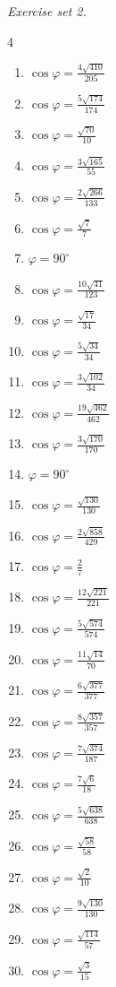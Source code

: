 \par\noindent\emph{Exercise set 2.}\nopagebreak
\begin{multicols}{4}\raggedright
\begin{enumerate}[label=\arabic*., leftmargin=*, itemsep=1pt]
\item $\cos\varphi=\frac{4 \sqrt{410}}{205}$
\item $\cos\varphi=\frac{5 \sqrt{174}}{174}$
\item $\cos\varphi=\frac{\sqrt{70}}{10}$
\item $\cos\varphi=\frac{3 \sqrt{165}}{55}$
\item $\cos\varphi=\frac{2 \sqrt{266}}{133}$
\item $\cos\varphi=\frac{\sqrt{7}}{7}$
\item $\varphi=90^\circ$
\item $\cos\varphi=\frac{10 \sqrt{41}}{123}$
\item $\cos\varphi=\frac{\sqrt{17}}{34}$
\item $\cos\varphi=\frac{5 \sqrt{34}}{34}$
\item $\cos\varphi=\frac{3 \sqrt{102}}{34}$
\item $\cos\varphi=\frac{19 \sqrt{462}}{462}$
\item $\cos\varphi=\frac{3 \sqrt{170}}{170}$
\item $\varphi=90^\circ$
\item $\cos\varphi=\frac{\sqrt{130}}{130}$
\item $\cos\varphi=\frac{2 \sqrt{858}}{429}$
\item $\cos\varphi=\frac{2}{7}$
\item $\cos\varphi=\frac{12 \sqrt{221}}{221}$
\item $\cos\varphi=\frac{5 \sqrt{574}}{574}$
\item $\cos\varphi=\frac{11 \sqrt{14}}{70}$
\item $\cos\varphi=\frac{6 \sqrt{377}}{377}$
\item $\cos\varphi=\frac{8 \sqrt{357}}{357}$
\item $\cos\varphi=\frac{7 \sqrt{374}}{187}$
\item $\cos\varphi=\frac{7 \sqrt{6}}{18}$
\item $\cos\varphi=\frac{5 \sqrt{638}}{638}$
\item $\cos\varphi=\frac{\sqrt{58}}{58}$
\item $\cos\varphi=\frac{\sqrt{2}}{10}$
\item $\cos\varphi=\frac{9 \sqrt{130}}{130}$
\item $\cos\varphi=\frac{\sqrt{114}}{57}$
\item $\cos\varphi=\frac{\sqrt{3}}{15}$
\end{enumerate}
\end{multicols}
